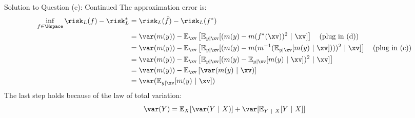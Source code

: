 \documentclass[aspectratio=169]{beamer}
\newcommand{\Eyx}{\mathbb{E}_{y|\xv}}
\newcommand{\my}{m(y)}
\begin{document}
\begin{frame}{Solution to Question (e): Continued}
	The approximation error is:
	\begin{align*}
		\inf_{f \in \Hspace} \risk_L(f) - \risk_L^*
		&= \risk_L(\bar{f}) - \risk_L(f^*) \\
		&= \var(\my) - \mathbb{E}_\xv \left[ \Eyx [(\my - m(f^*(\xv))^2 \ | \ \xv] \right] \quad \text{(plug in (d))} \\
		&= \var(\my) - \mathbb{E}_\xv \left[ \Eyx [(\my - m(m^{-1}(\Eyx[\my \ | \  \xv])))^2 \ | \ \xv] \right] \quad \text{(plug in (c))} \\
		&= \var(\my) - \mathbb{E}_\xv \left[ \Eyx [(\my - \Eyx[\my \ | \  \xv])^2 \ | \ \xv] \right] \\
		&= \var(\my) - \mathbb{E}_\xv \left[ \var(\my \ | \ \xv) \right]  \\
		&= \var(\Eyx[\my \ | \ \xv])
	\end{align*}
The last step holds because of the law of total variation:
$$
	\var(Y) = \mathbb{E}_X[\var(Y \ | \ X)] + \var[\mathbb{E}_{Y \ | \ X} [Y \ | \ X]]
$$
\end{frame}
\end{document}

